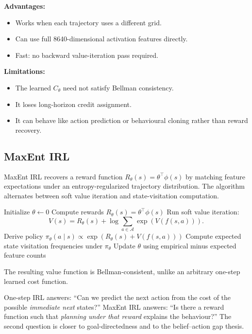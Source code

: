 \documentclass[11pt,a4paper]{article}
\newcommand{\A}{\mathcal{A}}
\begin{document}
\textbf{Advantages:}
\begin{itemize}[leftmargin=*]
\item Works when each trajectory uses a different grid.
\item Can use full 8640-dimensional activation features directly.
\item Fast: no backward value-iteration pass required.
\end{itemize}

\textbf{Limitations:}
\begin{itemize}[leftmargin=*]
\item The learned $C_\theta$ need not satisfy Bellman consistency.
\item It loses long-horizon credit assignment.
\item It can behave like action prediction or behavioural cloning rather than reward recovery.
\end{itemize}

\subsection{MaxEnt IRL}

MaxEnt IRL recovers a reward function $R_\theta(s)=\theta^\top\phi(s)$ by matching feature expectations under an entropy-regularized trajectory distribution. The algorithm alternates between soft value iteration and state-visitation computation.

\begin{algorithm}[H]
\caption{MaxEnt IRL with Value Iteration}
\begin{algorithmic}[1]
\State Initialize $\theta\leftarrow 0$
\Repeat
\State Compute rewards $R_\theta(s)=\theta^\top\phi(s)$
\State Run soft value iteration:
\[
V(s)=R_\theta(s)+\log\sum_{a\in\A}\exp(V(f(s,a))).
\]
\State Derive policy $\pi_\theta(a\mid s)\propto\exp(R_\theta(s)+V(f(s,a)))$
\State Compute expected state visitation frequencies under $\pi_\theta$
\State Update $\theta$ using empirical minus expected feature counts
\end{algorithmic}
\end{algorithm}

The resulting value function is Bellman-consistent, unlike an arbitrary one-step learned cost function.

\begin{insight}
One-step IRL answers: ``Can we predict the next action from the cost of the possible \textit{immediate next} states?'' MaxEnt IRL answers: ``Is there a reward function such that \textit{planning under that reward} explains the behaviour?'' The second question is closer to goal-directedness and to the belief--action gap thesis.
\end{insight}
\end{document}
